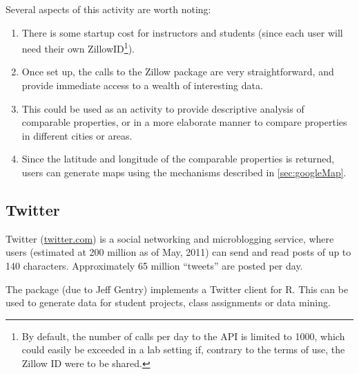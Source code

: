 Several aspects of this activity are worth noting: 
\begin{enumerate}
\item There is some startup cost for instructors and students (since each user will need
their own ZillowID\footnote{By default, the number of calls per day to the API is limited to 1000,
which could easily be exceeded in a lab setting if, contrary to the terms of use, the Zillow ID
were to be shared.}).  
\item Once set up, the calls to the Zillow package are very straightforward, and provide
immediate access to a wealth of interesting data.
\item This could be used as an activity to provide descriptive analysis of comparable 
properties, or in a more elaborate manner to compare properties in different cities or
areas.
\item Since the latitude and longitude of the comparable properties is returned, users
can generate maps using the mechanisms described in \ref{sec:googleMap}.
\end{enumerate}

\subsection{Twitter}
\label{sec:twitter}


Twitter (\url{twitter.com}) is a social networking and microblogging service, where users
(estimated at 200 million as of May, 2011) can send and read posts of up to 140 characters.
Approximately 65 million ``tweets'' are posted per day.

The  package (due to Jeff Gentry) implements a Twitter client for R.
This can be used to generate data for student projects, class assignments or data mining.


